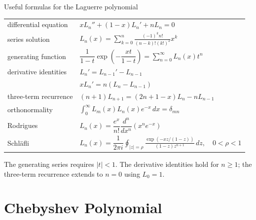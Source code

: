 \documentclass[11pt]{beamer}
\begin{document}
\begin{frame}{Useful formulas for the Laguerre polynomial}
\footnotesize
\begin{center}
\renewcommand{\arraystretch}{1.7}
\begin{tabular}{ll}
differential equation
  & $xL_n''+(1-x)L_n'+nL_n=0$ \\
series solution
  & $L_n(x)=\displaystyle\sum_{k=0}^{n}
       \frac{(-1)^k n!}{(n-k)!(k!)^2}x^k$ \\
generating function
  & $\dfrac{1}{1-t}\exp\!\left(-\dfrac{xt}{1-t}\right)
       =\displaystyle\sum_{n=0}^{\infty}L_n(x)t^n$ \\
derivative identities
  & $L_n'=L_{n-1}'-L_{n-1}$ \\
  & $xL_n'=n(L_n-L_{n-1})$ \\
three-term recurrence
  & $(n+1)L_{n+1}=(2n+1-x)L_n-nL_{n-1}$ \\
orthonormality
  & $\displaystyle\int_0^{\infty}L_m(x)L_n(x)e^{-x}\,dx=\delta_{mn}$ \\
Rodrigues
  & $L_n(x)=\dfrac{e^x}{n!}\dfrac{d^n}{dx^n}
       \left(x^ne^{-x}\right)$ \\
Schl\"afli
  & $L_n(x)=\dfrac{1}{2\pi i}
       \displaystyle\oint_{|z|=\rho}
       \frac{\exp\!\left(-xz/(1-z)\right)}
            {(1-z)z^{n+1}}\,dz,\quad 0<\rho<1$
\end{tabular}
\end{center}
\vspace{0.2em}
{\scriptsize The generating series requires $|t|<1$.
The derivative identities hold for $n\ge1$; the three-term recurrence extends
to $n=0$ using $L_0=1$.}
\end{frame}

\section{Chebyshev Polynomial}
\end{document}
